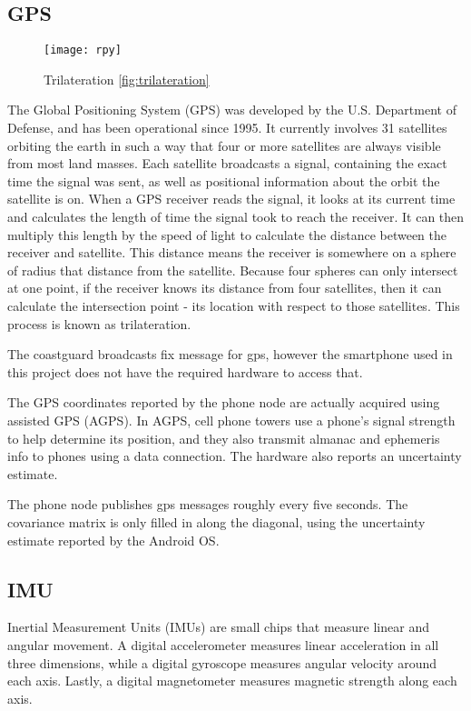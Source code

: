 \subsection{GPS}
\begin{wrapfigure}{R}{0.5\textwidth} 
	\caption{Trilateration \ref{fig:trilateration}}
	\centering
	\texttt{[image: rpy]}
\end{wrapfigure}

The Global Positioning System (GPS) was developed by the U.S. Department of Defense, and has been operational since 1995. It currently involves 31 satellites orbiting the earth in such a way that four or more satellites are always visible from most land masses. Each satellite broadcasts a signal, containing the exact time the signal was sent, as well as positional information about the orbit the satellite is on. When a GPS receiver reads the signal, it looks at its current time and calculates the length of time the signal took to reach the receiver. It can then multiply this length by the speed of light to calculate the distance between the receiver and satellite. This distance means the receiver is somewhere on a sphere of radius that distance from the satellite. Because four spheres can only intersect at one point, if the receiver knows its distance from four satellites, then it can calculate the intersection point - its location with respect to those satellites. This process is known as trilateration. \cite{GPS_trilateration}

The coastguard broadcasts fix message for gps, however the smartphone used in this project does not have the required hardware to access that.

The GPS coordinates reported by the phone node are actually acquired using assisted GPS (AGPS). In AGPS, cell phone towers use a phone's signal strength to help determine its position, and they also transmit almanac and ephemeris info to phones using a data connection. The hardware also reports an uncertainty estimate.\cite{}

The phone node publishes gps messages roughly every five seconds. The covariance matrix is only filled in along the diagonal, using the uncertainty estimate reported by the Android OS.

\subsection{IMU}

Inertial Measurement Units (IMUs) are small chips that measure linear and angular movement. A digital accelerometer measures linear acceleration in all three dimensions, while a digital gyroscope measures angular velocity around each axis. Lastly, a digital magnetometer measures magnetic strength along each axis.

